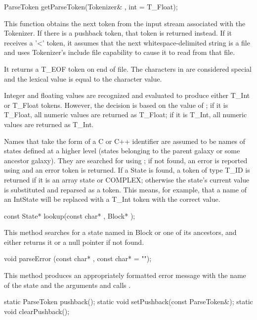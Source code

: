 \begin{example}
ParseToken getParseToken(Tokenizer& , int = T_Float);
\end{example}

This function obtains the next token from the input stream associated
with the Tokenizer.  If there is a pushback token, that token is
returned instead.  If it receives a '<' token, it assumes that the
next whitespace-delimited string is a file and uses Tokenizer's include
file capability to cause it to read from that file.

It returns a T_EOF token on end of file.  The characters in \code{,[]+*-/()^}
are considered special and the lexical value is equal to the character
value.

Integer and floating values are recognized and evaluated to produce
either T_Int or T_Float tokens.  However, the decision is based on
the value of ; if it is T_Float, all numeric values
are returned as T_Float; if it is T_Int, all numeric values are returned
as T_Int.

Names that take the form of a
C or C++ identifier are assumed to be names of states defined at a
higher level (states belonging to the parent galaxy or some ancestor
galaxy).  They are searched for using ; if not found,
an error is reported using  and an error token is
returned.  If a State is found, a token of type T_ID is returned if
it is an array state or COMPLEX; otherwise the state's current value
is substituted and reparsed as a token.  This means, for example, that
a name of an IntState will be replaced with a T_Int token with the
correct value.

\begin{example}
const State* lookup(const char* , Block* );
\end{example}

This method searches for a state named  in Block  or
one of its ancestors, and either returns it or a null pointer if
not found.

\begin{example}
void parseError (const char* , const char*  = "");
\end{example}

This method produces an appropriately formatted error message with
the name of the state and the arguments and calls .

\begin{example}
static ParseToken pushback();
static void setPushback(const ParseToken&);
static void clearPushback();
\end{example}

